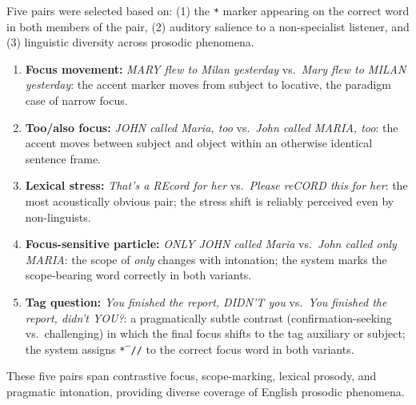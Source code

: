 Five pairs were selected based on: (1) the \texttt{*} marker appearing on
the correct word in both members of the pair, (2) auditory salience to a
non-specialist listener, and (3) linguistic diversity across prosodic
phenomena.

\begin{enumerate}
\item \textbf{Focus movement:} \textit{MARY flew to Milan yesterday}
      vs.\ \textit{Mary flew to MILAN yesterday}: the accent marker moves
      from subject to locative, the paradigm case of narrow focus.
\item \textbf{Too/also focus:} \textit{JOHN called Maria, too}
      vs.\ \textit{John called MARIA, too}: the accent moves between
      subject and object within an otherwise identical sentence frame.
\item \textbf{Lexical stress:} \textit{That's a REcord for her}
      vs.\ \textit{Please reCORD this for her}: the most acoustically
      obvious pair; the stress shift is reliably perceived even by
      non-linguists.
\item \textbf{Focus-sensitive particle:} \textit{ONLY JOHN called Maria}
      vs.\ \textit{John called only MARIA}: the scope of \textit{only}
      changes with intonation; the system marks the scope-bearing word
      correctly in both variants.
\item \textbf{Tag question:} \textit{You finished the report, DIDN'T you}
      vs.\ \textit{You finished the report, didn't YOU?}: a pragmatically
      subtle contrast (confirmation-seeking vs.\ challenging) in which the
      final focus shifts to the tag auxiliary or subject; the system assigns
      \texttt{*‾//} to the correct focus word in both variants.
\end{enumerate}

These five pairs span contrastive focus, scope-marking, lexical prosody, and
pragmatic intonation, providing diverse coverage of English prosodic phenomena.

